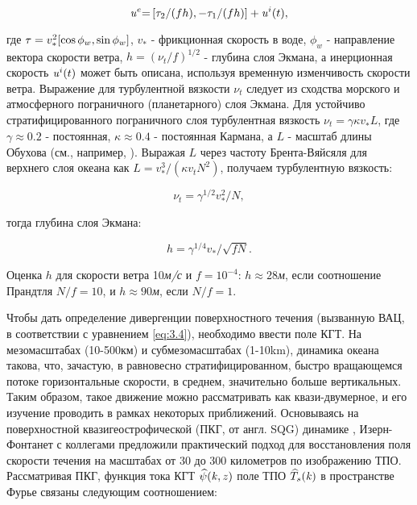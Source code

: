 \begin{equation} \label{eq:3.5} {\it u}^{e} {\it =}\left[\tau _{2} /(fh),-\tau _{1} /(fh)\right]+{\it u}^{i} (t),  \end{equation} 



\noindent где ${\it \tau }=v_{*}^{2} [\cos \phi _{w} ,\sin \phi _{w} ]$, $v_{*} $ - фрикционная скорость в воде, $\phi _{w} $ - направление вектора скорости ветра, $h=(\nu _{t} /f)^{1/2} $ - глубина слоя Экмана, а инерционная скорость ${\it u}^{i} (t)$ может быть описана, используя временную изменчивость скорости ветра. Выражение для турбулентной вязкости $\nu _{t} $ следует из сходства морского и атмосферного пограничного (планетарного) слоя Экмана. Для устойчиво стратифицированного пограничного слоя турбулентная вязкость $\nu _{t} =\gamma \kappa v_{*}^{} L$, где $\gamma \approx 0.2$ - постоянная, $\kappa \approx 0.4$ - постоянная Кармана, а $L$ - масштаб длины Обухова (см., например, \citep{Brown1982}). Выражая $L$ через частоту Брента-Вяйсяля для верхнего слоя океана как $L=v_{*}^{3} /(\kappa v_{t} N^{2} )$, получаем турбулентную вязкость:



\begin{equation} \label{eq:3.6} \nu _{t} =\gamma ^{1/2} v_{*}^{2} /N,  \end{equation}



\noindent тогда глубина слоя Экмана:



\begin{equation} \label{eq:3.7} h=\gamma ^{1/4} v_{*} /\sqrt{fN} .  \end{equation} 



Оценка $h$ для скорости ветра 10\textit{м/с} и $f=10^{-4} $: $h\approx 28$\textit{м}, если соотношение Прандтля $N/f=10$, и $h\approx 90$\textit{м}, если $N/f=1$.

Чтобы дать определение дивергенции поверхностного течения (вызванную ВАЦ, в соответствии с уравнением \eqref{eq:3.4}), необходимо ввести поле КГТ. На мезомасштабах (10-500км) и субмезомасштабах (1-10km), динамика океана такова, что, зачастую, в равновесно стратифицированном, быстро вращающемся потоке горизонтальные скорости, в среднем, значительно больше вертикальных. Таким образом, такое движение можно рассматривать как квази-двумерное, и его изучение проводить в рамках некоторых приближений. Основываясь на поверхностной квазигеострофической (ПКГ, от англ. SQG) динамике \citep{Held1995,Lapeyre2006}, Изерн-Фонтанет с коллегами \citep{Isern-Fontanet2008} предложили практический подход для восстановления поля скорости течения на масштабах от 30 до 300 километров по изображению ТПО. Рассматривая ПКГ, функция тока КГТ $\widehat{\psi }({\it k},z)$ поле ТПО $\widehat{T}_{s} ({\it k})$ в пространстве Фурье связаны следующим соотношением:




